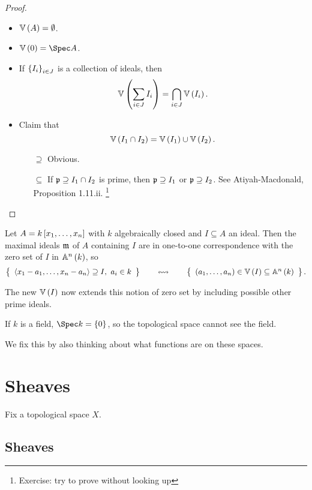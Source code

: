 \begin{proof}
\hfill
\begin{itemize}
\item $ \VV\br{A} = \emptyset $.
\item $ \VV\br{0} = \Spec A $.
\item If $ \cbr{I_i}_{i \in J} $ is a collection of ideals, then
$$ \VV\br{\sum_{i \in J} I_i} = \bigcap_{i \in J} \VV\br{I_i}. $$
\item Claim that
$$ \VV\br{I_1 \cap I_2} = \VV\br{I_1} \cup \VV\br{I_2}. $$
\begin{itemize}
\item[$ \supseteq $] Obvious.
\item[$ \subseteq $] If $ \mathfrak{p} \supseteq I_1 \cap I_2 $ is prime, then $ \mathfrak{p} \supseteq I_1 $ or $ \mathfrak{p} \supseteq I_2 $. See Atiyah-Macdonald, Proposition 1.11.ii. \footnote{Exercise: try to prove without looking up}
\end{itemize}
\end{itemize}
\end{proof}

\begin{example*}
Let $ A = k\sbr{x_1, \dots, x_n} $ with $ k $ algebraically closed and $ I \subseteq A $ an ideal. Then the maximal ideals $ \mathfrak{m} $ of $ A $ containing $ I $ are in one-to-one correspondence with the zero set of $ I $ in $ \AA^n\br{k} $, so
$$ \correspondence{\abr{x_1 - a_1, \dots, x_n - a_n} \supseteq I, \ a_i \in k}{\br{a_1, \dots, a_n} \in \VV\br{I} \subseteq \AA^n\br{k}}. $$
\end{example*}

The new $ \VV\br{I} $ now extends this notion of zero set by including possible other prime ideals.

\begin{example*}
If $ k $ is a field, $ \Spec k = \cbr{0} $, so the topological space cannot see the field.
\end{example*}

We fix this by also thinking about what functions are on these spaces.

\pagebreak

\section{Sheaves}

Fix a topological space $ X $.

\subsection{Sheaves}

